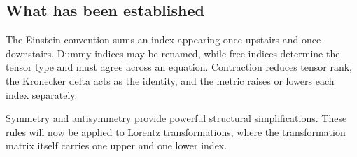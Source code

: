 \subsection{What has been established}

The Einstein convention sums an index appearing once upstairs and once downstairs. Dummy indices may be renamed, while free indices determine the tensor type and must agree across an equation. Contraction reduces tensor rank, the Kronecker delta acts as the identity, and the metric raises or lowers each index separately.

Symmetry and antisymmetry provide powerful structural simplifications. These rules will now be applied to Lorentz transformations, where the transformation matrix itself carries one upper and one lower index.